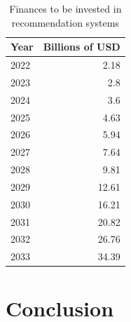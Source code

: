 \documentclass[10pt,twoside,slovak,a4paper]{article}
\begin{document}
\begin{table}
\centering
    \begin{tabular}{l|r}
        Year  & Billions of USD \\\hline
        2022  & 2.18  \\
        2023  & 2.8   \\
        2024  & 3.6   \\
        2025  & 4.63  \\
        2026  & 5.94  \\
        2027  & 7.64  \\
        2028  & 9.81   \\
        2029  & 12.61  \\
        2030  & 16.21  \\
        2031  & 20.82  \\
        2032  & 26.76  \\
        2033  & 34.39  \\
    \end{tabular}
    \caption{Finances to be invested in recommendation systems}
    \label{tab:widgets}
\end{table}
\section{Conclusion} \label{Conclusion}





\end{document}
